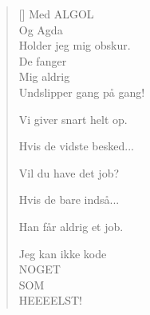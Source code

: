 \begin{multicols}
\begin{verse}[\versewidth]
Med ALGOL\\
Og Agda\\
Holder jeg mig obskur.\\
De fanger\\
Mig aldrig\\
Undslipper gang på gang!

Vi giver snart helt op.

Hvis de vidste besked...

Vil du have det job?

Hvis de bare indså...

Han får aldrig et job.


Jeg kan ikke kode\\
NOGET\\
SOM\\
HEEEELST!
\end{verse}
\end{multicols}
\newpage

